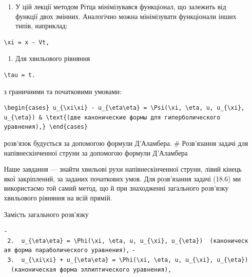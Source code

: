 \documentclass[
  ukrainian,
]{article}
\providecommand{\tightlist}{%
  \setlength{\itemsep}{0pt}\setlength{\parskip}{0pt}}
\begin{document}
\begin{enumerate}
\def\labelenumi{\arabic{enumi}.}
\tightlist
\item
  У цій лекції методом Рітца мінімізувався функціонал, що залежить від
  функції двох змінних. Аналогічно можна мінімізувати функціонали інших
  типів, наприклад:
\end{enumerate}

\begin{verbatim}
\xi = x - Vt,
\end{verbatim}

\begin{enumerate}
\def\labelenumi{\arabic{enumi}.}
\setcounter{enumi}{1}
\tightlist
\item
  Для хвильового рівняння
\end{enumerate}

\begin{verbatim}
\tau = t.
\end{verbatim}

з граничними та початковими умовами:

\begin{verbatim}
\begin{cases} u_{\xi\xi} - u_{\eta\eta} = \Psi(\xi, \eta, u, u_{\xi}, u_{\eta}) & \text{(две канонические формы для гиперболического уравнения),} \end{cases}
\end{verbatim}

розв'язок будується за допомогою формули Д'Аламбера. \# Розв'язання
задачі для напівнескінченної струни за допомогою формули Д'Аламбера

Наше завдання --- знайти хвильові рухи напівнескінченної струни, лівий
кінець якої закріплений, за заданих початкових умов. Для розв'язання
задачі (18.6) ми використаємо той самий метод, що й при знаходженні
загального розв'язку хвильового рівняння на всій прямій.

Замість загального розв'язку

\texttt{-\ 2.\ \ \textquotesingle{}u\_\{\textbackslash{}eta\textbackslash{}eta\}\ =\ \textbackslash{}Phi(\textbackslash{}xi,\ \textbackslash{}eta,\ u,\ u\_\{\textbackslash{}xi\},\ u\_\{\textbackslash{}eta\})\textquotesingle{}\ \ (каноническая\ форма\ параболического\ уравнения),}
\texttt{-\ 3.\ \ \textquotesingle{}u\_\{\textbackslash{}xi\textbackslash{}xi\}\ +\ u\_\{\textbackslash{}eta\textbackslash{}eta\}\ =\ \textbackslash{}Phi(\textbackslash{}xi,\ \textbackslash{}eta,\ u,\ u\_\{\textbackslash{}xi\},\ u\_\{\textbackslash{}eta\})\textquotesingle{}\ \ (каноническая\ форма\ эллиптического\ уравнения),}
\end{document}
